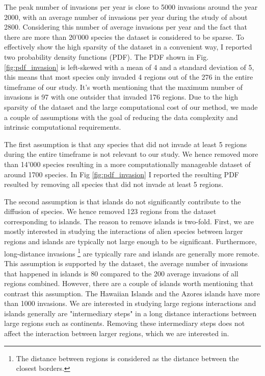 \documentclass[mscthesis]{usiinfthesis}
\begin{document}
The peak number of invasions per year is close to 5000 invasions around the year 2000, with an average number of invasions per year during the study of about 2800. Considering this number of average invasions per year and the fact that there are more than 20'000 species the dataset is considered to be sparse. To effectively show the high sparsity of the dataset in a convenient way, I reported two probability density functions (PDF). The PDF shown in Fig. \ref{fig:pdf_invasion} is left-skewed with a mean of 4 and a standard deviation of 5, this means that most species only invaded 4 regions out of the 276 in the entire timeframe of our study. It's worth mentioning that the maximum number of invasions is 97 with one outsider that invaded 176 regions. Due to the high sparsity of the dataset and the large computational cost of our method, we made a couple of assumptions with the goal of reducing the data complexity and intrinsic computational requirements. 

The first assumption is that any species that did not invade at least 5 regions during the entire timeframe is not relevant to our study. We hence removed more than 14'000 species resulting in a more computationally manageable dataset of around 1700 species. In Fig \ref{fig:pdf_invasion} I reported the resulting PDF resulted by removing all species that did not invade at least 5 regions. 

The second assumption is that islands do not significantly contribute to the diffusion of species. We hence removed 123 regions from the dataset corresponding to islands. The reason to remove islands is two-fold. First, we are mostly interested in studying the interactions of alien species between larger regions and islands are typically not large enough to be significant. Furthermore, long-distance invasions \footnote{The distance between regions is considered as the distance between the closest borders.} are typically rare \cite{paper:lady} and islands are generally more remote. This assumption is supported by the dataset, the average number of invasions that happened in islands is 80 compared to the 200 average invasions of all regions combined. However, there are a couple of islands worth mentioning that contrast this assumption. The Hawaiian Islands and the Azores islands have more than 1000 invasions. We are interested in studying large regions interactions and islands generally are "intermediary steps" in a long distance interactions between large regions such as continents. Removing these intermediary steps does not affect the interaction between larger regions, which we are interested in.
\end{document}
